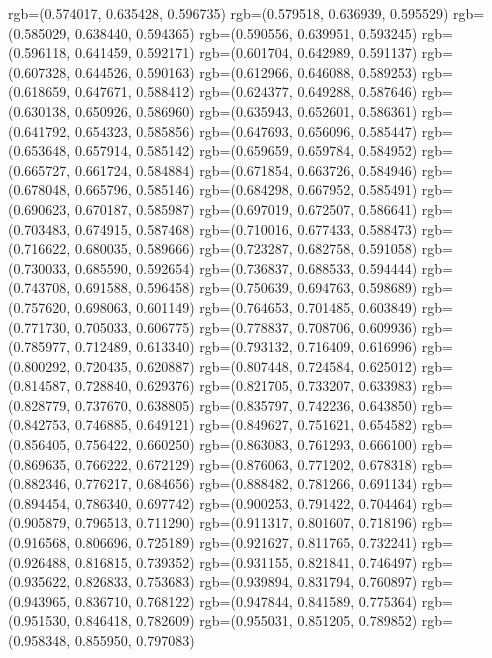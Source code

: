 {{{					rgb=(0.574017, 0.635428, 0.596735)
					rgb=(0.579518, 0.636939, 0.595529)
					rgb=(0.585029, 0.638440, 0.594365)
					rgb=(0.590556, 0.639951, 0.593245)
					rgb=(0.596118, 0.641459, 0.592171)
					rgb=(0.601704, 0.642989, 0.591137)
					rgb=(0.607328, 0.644526, 0.590163)
					rgb=(0.612966, 0.646088, 0.589253)
					rgb=(0.618659, 0.647671, 0.588412)
					rgb=(0.624377, 0.649288, 0.587646)
					rgb=(0.630138, 0.650926, 0.586960)
					rgb=(0.635943, 0.652601, 0.586361)
					rgb=(0.641792, 0.654323, 0.585856)
					rgb=(0.647693, 0.656096, 0.585447)
					rgb=(0.653648, 0.657914, 0.585142)
					rgb=(0.659659, 0.659784, 0.584952)
					rgb=(0.665727, 0.661724, 0.584884)
					rgb=(0.671854, 0.663726, 0.584946)
					rgb=(0.678048, 0.665796, 0.585146)
					rgb=(0.684298, 0.667952, 0.585491)
					rgb=(0.690623, 0.670187, 0.585987)
					rgb=(0.697019, 0.672507, 0.586641)
					rgb=(0.703483, 0.674915, 0.587468)
					rgb=(0.710016, 0.677433, 0.588473)
					rgb=(0.716622, 0.680035, 0.589666)
					rgb=(0.723287, 0.682758, 0.591058)
					rgb=(0.730033, 0.685590, 0.592654)
					rgb=(0.736837, 0.688533, 0.594444)
					rgb=(0.743708, 0.691588, 0.596458)
					rgb=(0.750639, 0.694763, 0.598689)
					rgb=(0.757620, 0.698063, 0.601149)
					rgb=(0.764653, 0.701485, 0.603849)
					rgb=(0.771730, 0.705033, 0.606775)
					rgb=(0.778837, 0.708706, 0.609936)
					rgb=(0.785977, 0.712489, 0.613340)
					rgb=(0.793132, 0.716409, 0.616996)
					rgb=(0.800292, 0.720435, 0.620887)
					rgb=(0.807448, 0.724584, 0.625012)
					rgb=(0.814587, 0.728840, 0.629376)
					rgb=(0.821705, 0.733207, 0.633983)
					rgb=(0.828779, 0.737670, 0.638805)
					rgb=(0.835797, 0.742236, 0.643850)
					rgb=(0.842753, 0.746885, 0.649121)
					rgb=(0.849627, 0.751621, 0.654582)
					rgb=(0.856405, 0.756422, 0.660250)
					rgb=(0.863083, 0.761293, 0.666100)
					rgb=(0.869635, 0.766222, 0.672129)
					rgb=(0.876063, 0.771202, 0.678318)
					rgb=(0.882346, 0.776217, 0.684656)
					rgb=(0.888482, 0.781266, 0.691134)
					rgb=(0.894454, 0.786340, 0.697742)
					rgb=(0.900253, 0.791422, 0.704464)
					rgb=(0.905879, 0.796513, 0.711290)
					rgb=(0.911317, 0.801607, 0.718196)
					rgb=(0.916568, 0.806696, 0.725189)
					rgb=(0.921627, 0.811765, 0.732241)
					rgb=(0.926488, 0.816815, 0.739352)
					rgb=(0.931155, 0.821841, 0.746497)
					rgb=(0.935622, 0.826833, 0.753683)
					rgb=(0.939894, 0.831794, 0.760897)
					rgb=(0.943965, 0.836710, 0.768122)
					rgb=(0.947844, 0.841589, 0.775364)
					rgb=(0.951530, 0.846418, 0.782609)
					rgb=(0.955031, 0.851205, 0.789852)
					rgb=(0.958348, 0.855950, 0.797083)
}}}

